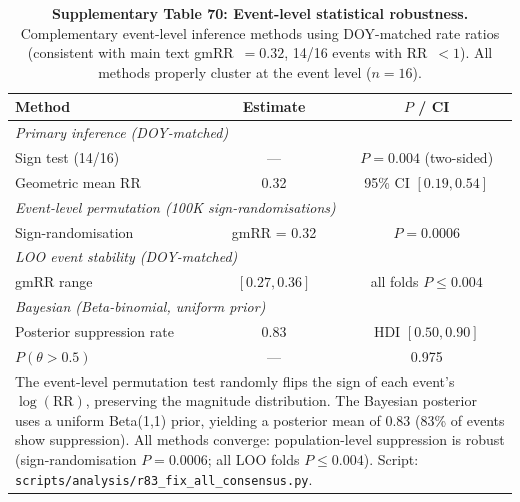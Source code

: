 \documentclass[11pt,letterpaper]{article}
\begin{document}
\begin{table}[!ht]
\centering
\caption{\textbf{Supplementary Table 70: Event-level statistical robustness.}
Complementary event-level inference methods using DOY-matched rate ratios (consistent with main text gmRR~$= 0.32$, 14/16 events with RR~$< 1$). All methods properly cluster at the event level ($n = 16$).}
\label{tab:event_robustness}
\small
\begin{tabular}{lcc}
\toprule
Method & Estimate & $P$ / CI \\
\midrule
\multicolumn{3}{l}{\textit{Primary inference (DOY-matched)}} \\
Sign test (14/16) & --- & $P = 0.004$ (two-sided) \\
Geometric mean RR & 0.32 & 95\% CI $[0.19, 0.54]$ \\
\midrule
\multicolumn{3}{l}{\textit{Event-level permutation (100K sign-randomisations)}} \\
Sign-randomisation & gmRR = 0.32 & $P = 0.0006$ \\
\midrule
\multicolumn{3}{l}{\textit{LOO event stability (DOY-matched)}} \\
gmRR range & $[0.27, 0.36]$ & all folds $P \leq 0.004$ \\
\midrule
\multicolumn{3}{l}{\textit{Bayesian (Beta-binomial, uniform prior)}} \\
Posterior suppression rate & 0.83 & HDI $[0.50, 0.90]$ \\
$P(\theta > 0.5)$ & --- & 0.975 \\
\bottomrule
\multicolumn{3}{p{12cm}}{\footnotesize The event-level permutation test randomly flips the sign of each event's $\log(\mathrm{RR})$, preserving the magnitude distribution. The Bayesian posterior uses a uniform Beta(1,1) prior, yielding a posterior mean of 0.83 (83\% of events show suppression). All methods converge: population-level suppression is robust (sign-randomisation $P = 0.0006$; all LOO folds $P \leq 0.004$). Script: \texttt{scripts/analysis/r83\_fix\_all\_consensus.py}.} \\
\end{tabular}
\end{table}
\end{document}
